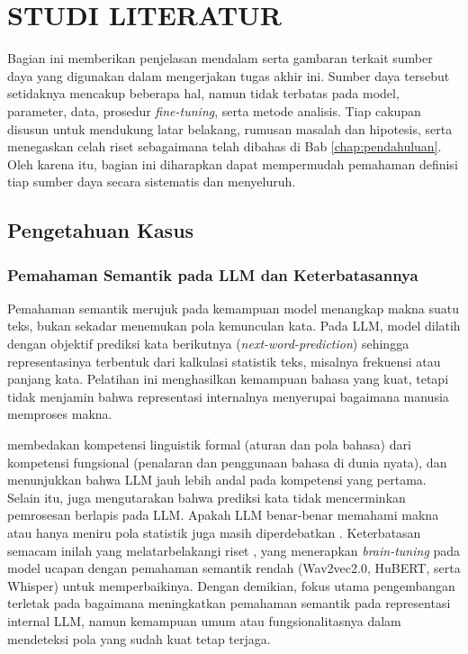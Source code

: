 \cleardoublepage %

\chapter{STUDI LITERATUR}
\label{chap:studi-literatur}

Bagian ini memberikan penjelasan mendalam serta gambaran terkait sumber daya yang digunakan dalam mengerjakan tugas akhir ini. Sumber daya tersebut setidaknya mencakup beberapa hal, namun tidak terbatas pada model, parameter, data, prosedur \textit{fine-tuning}, serta metode analisis. Tiap cakupan disusun untuk mendukung latar belakang, rumusan masalah dan hipotesis, serta menegaskan celah riset sebagaimana telah dibahas di Bab \ref{chap:pendahuluan}. Oleh karena itu, bagian ini diharapkan dapat mempermudah pemahaman definisi tiap sumber daya secara sistematis dan menyeluruh.

\section{Pengetahuan Kasus}
\label{chap:sl_ptk}

\subsection{Pemahaman Semantik pada LLM dan Keterbatasannya}
\label{sub:sl_semantik}

Pemahaman semantik merujuk pada kemampuan model menangkap makna suatu teks, bukan sekadar menemukan pola kemunculan kata. Pada LLM, model dilatih dengan objektif prediksi kata berikutnya (\textit{next-word-prediction}) sehingga representasinya terbentuk dari kalkulasi statistik teks, misalnya frekuensi atau panjang kata. Pelatihan ini menghasilkan kemampuan bahasa yang kuat, tetapi tidak menjamin bahwa representasi internalnya menyerupai bagaimana manusia memproses makna. 

\textcite{mahowald2024dissociating} membedakan kompetensi linguistik formal (aturan dan pola bahasa) dari kompetensi fungsional (penalaran dan penggunaan bahasa di dunia nyata), dan menunjukkan bahwa LLM jauh lebih andal pada kompetensi yang pertama. Selain itu, \textcite{yu2024predicting} juga mengutarakan bahwa prediksi kata tidak mencerminkan pemrosesan berlapis pada LLM. Apakah LLM benar-benar memahami makna atau hanya meniru pola statistik juga masih diperdebatkan \autocite{mitchell2023debate}. Keterbatasan semacam inilah yang melatarbelakangi riset \textcite{moussa2025improving}, yang menerapkan \textit{brain-tuning} pada model ucapan dengan pemahaman semantik rendah (Wav2vec2.0, HuBERT, serta Whisper) untuk memperbaikinya. Dengan demikian, fokus utama pengembangan terletak pada bagaimana meningkatkan pemahaman semantik pada representasi internal LLM, namun kemampuan umum atau fungsionalitasnya dalam mendeteksi pola yang sudah kuat tetap terjaga.


